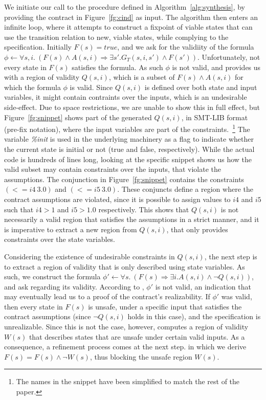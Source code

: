 We initiate our call to the procedure defined in Algorithm~\ref{alg:synthesis},
by providing the contract in Figure~\ref{fg:cind} as input. The algorithm
then enters an infinite loop, where it attempts to construct a fixpoint of
viable states that can use the transition relation to new, viable states,
while complying to the specification. Initially $F(s) = true$, and we ask \aeval for the validiity of the formula $\phi \gets \forall s,i. \ (F(s) \land A(s,i) \Rightarrow \exists s'.G_{T}(s,i,s') \land F(s'))$. Unfortunately, not every state in $F(s)$
satisfies the formula. As such $\phi$ is not valid, and \aeval provides us with
a region of validity $Q(s,i)$, which is a subset of $F(s) \land A(s,i)$ for
which the formula $\phi$ is valid. Since $Q(s,i)$ is defined over both state and
input variables, it might contain contraints over the inputs, which is an
undesirable side-effect. Due to space restrictions, we are unable to show this
in full effect, but Figure~\ref{fg:snippet} shows part of the generated
$Q(s,i)$, in SMT-LIB format (pre-fix notation), where the input variables are
part of the constraints.~\footnote{The names in the snippet have been simplified to match the rest of the paper.} The variable \textit{\%init} is used in the underlying
machinery as a flag to indicate whether the current state is initial or not
(true and false, respectively). While the actual code is hundreds of lines long, looking at the specific snippet shows us how the valid subset may contain constraints over the inputs, that violate the assumptions. The conjunction in Figure~\ref{fg:snippet} contains the constraints $(<= i4 \ 3.0)$ and $(<= i5 \ 3.0)$. These conjuncts define a region where the contract assumptions are violated, since it is possible to assign values to $i4$ and $i5$ such that $i4 > 1$ and $i5 > 1.0$ respectively. This shows that $Q(s,i)$ is not necessarily a valid region that satisfies the assumptions in a strict manner, and it is imperative to extract a new region from $Q(s,i)$, that only provides constraints over the state variables.



Considering the existence of undesirable constraints in $Q(s,i)$, the next step
is to extract a region of validity that is only described using state variables.
As such, we construct the formula $\phi' \gets \forall s. \ (F(s) \Rightarrow \exists
i. A(s,i) \land \lnot Q(s,i))$, and ask \aeval regarding its validity. According
to \aeval, $\phi'$ is not valid, an indication that may eventually lead us to a
proof of the contract's realizability. If $\phi'$ was valid, then every state in
$F(s)$ is unsafe, under a specific input that satisfies the contract
assumptions (since $\lnot Q(s,i)$ holds in this case), and the specification is unrealizable. Since this is not the case,
however, \aeval computes a region of validity $W(s)$ that describes states that are unsafe under certain valid inputs. As a consequence, a refinement process comes at the next step. in which we derive $F(s) = F(s) \land \lnot W(s)$, thus blocking the unsafe region $W(s)$.

